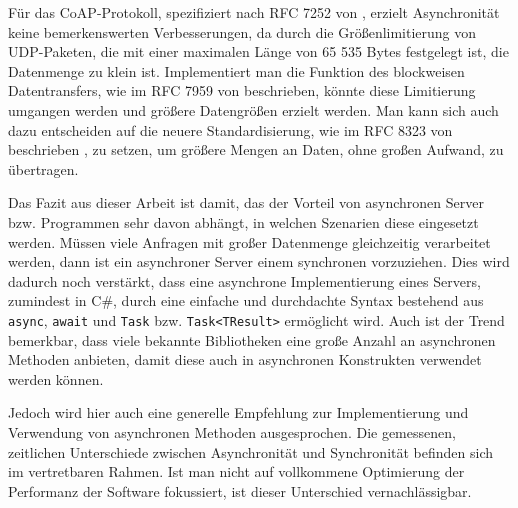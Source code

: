 Für das CoAP-Protokoll, spezifiziert nach RFC 7252 von \citeauthor{RFC7252} \cite{RFC7252}, erzielt Asynchronität keine bemerkenswerten Verbesserungen, da durch die Größenlimitierung von UDP-Paketen, die mit einer maximalen Länge von 65 535 Bytes festgelegt ist, die Datenmenge zu klein ist. Implementiert man die Funktion des blockweisen Datentransfers, wie im RFC 7959 von \citeauthor{RFC7959}  \cite{RFC7959} beschrieben, könnte diese Limitierung umgangen werden und größere Datengrößen erzielt werden. Man kann sich auch dazu entscheiden auf die neuere Standardisierung, wie im RFC 8323  von \citeauthor{RFC8323} beschrieben \cite{RFC8323}, zu setzen, um größere Mengen an Daten, ohne großen Aufwand, zu übertragen.

Das Fazit aus dieser Arbeit ist damit, das der Vorteil von asynchronen Server bzw. Programmen sehr davon abhängt, in welchen Szenarien diese eingesetzt werden. Müssen viele Anfragen mit großer Datenmenge gleichzeitig verarbeitet werden, dann ist ein asynchroner Server einem synchronen vorzuziehen. Dies wird dadurch noch verstärkt, dass eine asynchrone Implementierung eines Servers, zumindest in C\#, durch eine einfache und durchdachte Syntax bestehend aus \texttt{async}, \texttt{await} und \texttt{Task} bzw. \texttt{Task<TResult>} ermöglicht wird. Auch ist der Trend bemerkbar, dass viele bekannte Bibliotheken eine große Anzahl an asynchronen Methoden anbieten, damit diese auch in asynchronen Konstrukten verwendet werden können.

Jedoch wird hier auch eine generelle Empfehlung zur Implementierung und Verwendung von asynchronen Methoden ausgesprochen. Die gemessenen, zeitlichen Unterschiede zwischen Asynchronität und Synchronität befinden sich im vertretbaren Rahmen. Ist man nicht auf vollkommene Optimierung der Performanz der Software fokussiert, ist dieser Unterschied vernachlässigbar.